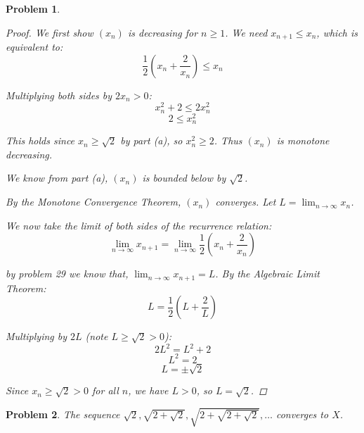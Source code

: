 \documentclass[12pt]{article}
\newtheorem{problem}{Problem}
\begin{document}
\begin{problem}
\begin{enumerate}
\begin{proof}
We first show $(x_n)$ is decreasing for $n \geq 1$. We need $x_{n+1} \leq x_n$, which is equivalent to:
$$\frac{1}{2}\left(x_n + \frac{2}{x_n}\right) \leq x_n$$

Multiplying both sides by $2x_n > 0$:
$$x_n^2 + 2 \leq 2x_n^2$$
$$2 \leq x_n^2$$

This holds since $x_n \geq \sqrt{2}$ by part (a), so $x_n^2 \geq 2$. Thus $(x_n)$ is monotone decreasing.

We know from part (a), $(x_n)$ is bounded below by $\sqrt{2}$.

By the Monotone Convergence Theorem, $(x_n)$ converges. Let $L = \lim_{n\to\infty} x_n$.

We now take the limit of both sides of the recurrence relation:
$$\lim_{n\to\infty} x_{n+1} = \lim_{n\to\infty} \frac{1}{2}\left(x_n + \frac{2}{x_n}\right)$$

by problem 29 we know that, $\lim_{n\to\infty} x_{n+1} = L$. By the Algebraic Limit Theorem:
$$L = \frac{1}{2}\left(L + \frac{2}{L}\right)$$

Multiplying by $2L$ (note $L \geq \sqrt{2} > 0$):
$$2L^2 = L^2 + 2$$
$$L^2 = 2$$
$$L = \pm\sqrt{2}$$

Since $x_n \geq \sqrt{2} > 0$ for all $n$, we have $L > 0$, so $L = \sqrt{2}$.
\end{proof}

\end{enumerate}
\end{problem}


\begin{problem} %
The sequence $\displaystyle \sqrt{2}, \sqrt{2+\sqrt{2}}, \sqrt{2 + \sqrt{2+\sqrt{2}}}, \dots$ converges to $X$.
\end{problem}

\end{document}
